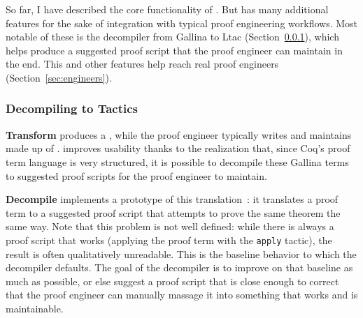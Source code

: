 So far, I have described the core functionality of \toolnamec.
But \toolnamec has many additional features for the sake of integration with typical proof engineering workflows.
Most notable of these is the decompiler from Gallina to Ltac (Section~\ref{sec:decompiler}),
which helps \toolnamec produce a suggested proof script that the proof engineer can maintain in the end.
This and other features help \toolnamec reach real proof engineers (Section~\ref{sec:engineers}).

\subsubsection{Decompiling to Tactics}
\label{sec:decompiler}

\textbf{Transform} produces a ,
while the proof engineer typically writes and maintains  made up of .
\toolnamec improves usability thanks to the realization that, since Coq's proof term language  is very structured,
it is possible to decompile these Gallina terms to suggested  proof scripts for the proof engineer 
to maintain.



\textbf{Decompile} implements a prototype of this translation~\href{https://github.com/uwplse/coq-plugin-lib/tree/9ef05815c261de9c99b604c6b581ba1c4fbc1a46/src/coq/decompiler/decompiler.ml}{}: %
it translates a proof term to a suggested proof script that attempts to prove the same theorem 
the same way.
Note that this problem is not well defined: while there is always a proof script that 
works (applying the proof term with the \lstinline{apply} tactic), the result is often qualitatively unreadable.
This is the baseline behavior to which the decompiler defaults.
The goal of the decompiler is to improve on that baseline as much as possible,
or else suggest a proof script that is close enough to correct that the proof engineer can
manually massage it into something that works and is maintainable.

